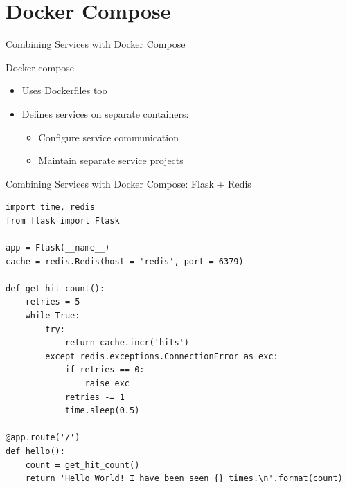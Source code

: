 \documentclass[10pt, compress, aspectratio=169, xcolor={table,usenames,dvipsnames}]{beamer}
\begin{document}
\section{Docker Compose}
\label{sec:orgdc785c9}
\begin{frame}[label={sec:org64a24e5}]{Combining Services with Docker Compose}
\begin{block}{Docker-compose}
\begin{itemize}
\item Uses \alert{Dockerfiles} too
\item Defines \alert{services} on \alert{separate containers}:
\begin{itemize}
\item Configure service \alert{communication}
\item Maintain separate service \alert{projects}
\end{itemize}
\end{itemize}
\end{block}
\end{frame}
\begin{frame}[label={sec:org66fab7f},fragile]{Combining Services with Docker Compose: Flask + Redis}
 \lstset{language=Python,label= ,caption= ,captionpos=b,numbers=none}
\begin{lstlisting}
import time, redis
from flask import Flask

app = Flask(__name__)
cache = redis.Redis(host = 'redis', port = 6379)

def get_hit_count():
    retries = 5
    while True:
        try:
            return cache.incr('hits')
        except redis.exceptions.ConnectionError as exc:
            if retries == 0:
                raise exc
            retries -= 1
            time.sleep(0.5)

@app.route('/')
def hello():
    count = get_hit_count()
    return 'Hello World! I have been seen {} times.\n'.format(count)
\end{lstlisting}
\end{frame}
\end{document}
